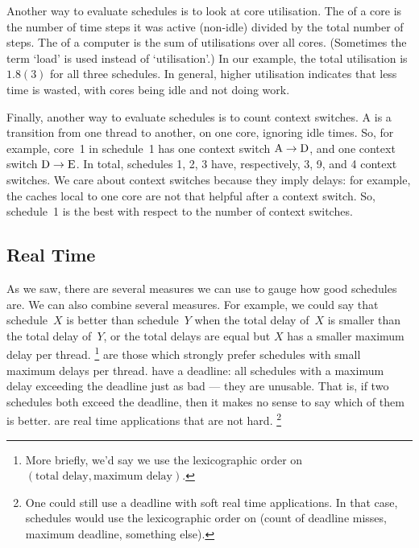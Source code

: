 Another way to evaluate schedules is to look at core utilisation.
The  of a core
  is the number of time steps it was active (non-idle)
  divided by the total number of steps.
The  of a computer is the sum of utilisations over all cores.
(Sometimes the term `load' is used instead of `utilisation'.)
In our example, the total utilisation is $1.8(3)$ for all three schedules.
In general, higher utilisation indicates that less time is wasted,
  with cores being idle and not doing work.

Finally, another way to evaluate schedules is to count context switches.
A  is a transition from one thread to another, on one core,
  ignoring idle times.
So, for example, core~1 in schedule~1 has one context switch ${\rm A}\to{\rm D}$,
  and one context switch ${\rm D}\to{\rm E}$.
In total, schedules 1, 2, 3 have, respectively, 3, 9, and 4 context switches.
We care about context switches because they imply delays:
  for example, the caches local to one core are not that helpful
  after a context switch.
So, schedule~1 is the best with respect to the number of context switches.

\subsection*{Real Time}

As we saw, there are several measures we can use to gauge how good schedules are.
We can also combine several measures.
For example,
  we could say that schedule~$X$ is better than schedule~$Y$
  when the total delay of~$X$ is smaller than the total delay of~$Y$,
    or the total delays are equal but $X$ has a smaller maximum delay per thread.%
\footnote{
  More briefly, we'd say we use the lexicographic order on
  $(\text{total delay}, \text{maximum delay})$.
}
 are those which strongly prefer schedules
  with small maximum delays per thread.
 have a deadline:
  all schedules with a maximum delay exceeding the deadline just as bad ---
  they are unusable.
That is, if two schedules both exceed the deadline,
  then it makes no sense to say which of them is better.
 are real time applications that are not hard.%
\footnote{
  One could still use a deadline with soft real time applications.
  In that case, schedules would use the lexicographic order on
    (count of deadline misses, maximum deadline, something else).
}

